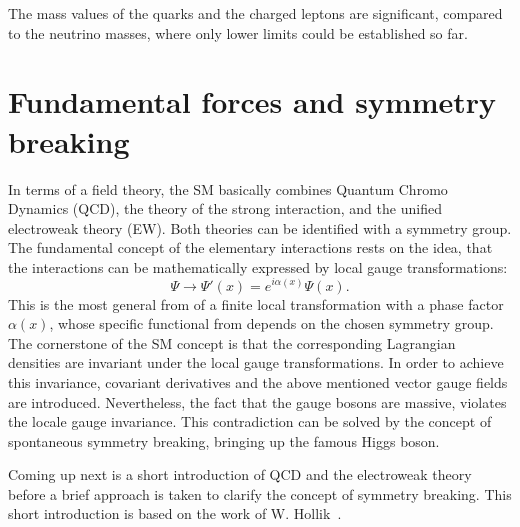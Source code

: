  The  mass values of the quarks and the charged leptons are significant, compared to the neutrino masses, where only lower limits could be established so far.
 
\vspace{0.1cm}




 


 
\section{Fundamental forces and symmetry breaking}
In terms of a field theory, the SM basically combines Quantum Chromo Dynamics (QCD), the theory of the strong interaction, and the unified electroweak theory (EW). Both theories can be identified with a symmetry group.
The fundamental concept of the  elementary interactions rests on the idea, that the interactions can be mathematically expressed by  local gauge transformations:
\begin{equation}\label{trafo}
\Psi \longrightarrow \Psi'(x) =  e^{i\alpha(x)}\Psi(x).
\end{equation}  
This is the most general from of a finite local transformation with a phase factor $\alpha(x)$, whose specific functional from depends  on the chosen symmetry group. 
The cornerstone of the SM concept is that the corresponding Lagrangian densities are invariant under the local gauge transformations.  
In order to achieve this invariance, covariant derivatives  and the above mentioned vector gauge fields are introduced. Nevertheless, the fact that the gauge bosons are massive, violates the locale gauge invariance. This contradiction can be solved by the concept of spontaneous symmetry breaking, bringing up the famous Higgs boson.

 Coming up next is a short introduction of QCD and the electroweak theory before a brief approach is taken to clarify the concept of symmetry breaking. This short introduction is based on the work of W. Hollik~\cite{Hollik:2010id}. 

